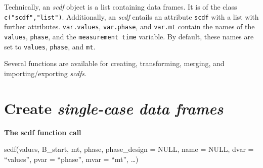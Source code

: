 \documentclass[
  letterpaper,
  DIV=11,
  numbers=noendperiod]{scrreprt}
\begin{document}
\begin{tcolorbox}[enhanced jigsaw, breakable, toptitle=1mm, colframe=quarto-callout-note-color-frame, arc=.35mm, titlerule=0mm, coltitle=black, rightrule=.15mm, bottomtitle=1mm, bottomrule=.15mm, colbacktitle=quarto-callout-note-color!10!white, title=\textcolor{quarto-callout-note-color}{\faInfo}\hspace{0.5em}{Note}, colback=white, opacitybacktitle=0.6, opacityback=0, leftrule=.75mm, toprule=.15mm, left=2mm]

Technically, an \emph{scdf} object is a list containing data frames. It
is of the class \texttt{c("scdf","list")}. Additionally, an \emph{scdf}
entails an attribute \texttt{scdf} with a list with further attributes.
\texttt{var.values}, \texttt{var.phase}, and \texttt{var.mt} contain the
names of the \texttt{values}, \texttt{phase}, and the
\texttt{measurement\ time} variable. By default, these names are set to
\texttt{values}, \texttt{phase}, and \texttt{mt}.

\end{tcolorbox}

Several functions are available for creating, transforming, merging, and
importing/exporting \emph{scdfs}.

\hypertarget{sec-scdf}{%
\section{\texorpdfstring{Create \emph{single-case data
frames}}{Create single-case data frames}}\label{sec-scdf}}

\begin{tcolorbox}[enhanced jigsaw, breakable, rightrule=.15mm, bottomrule=.15mm, arc=.35mm, colback=white, colframe=quarto-callout-tip-color-frame, opacityback=0, leftrule=.75mm, toprule=.15mm, left=2mm]
\begin{minipage}[t]{5.5mm}
\textcolor{quarto-callout-tip-color}{\faLightbulb}
\end{minipage}%
\begin{minipage}[t]{\textwidth - 5.5mm}

\textbf{The scdf function call}\vspace{2mm}

scdf(values, B\_start, mt, phase, phase\_design = NULL, name = NULL,
dvar = ``values'', pvar = ``phase'', mvar = ``mt'', \ldots)

\end{minipage}%
\end{tcolorbox}
\end{document}
